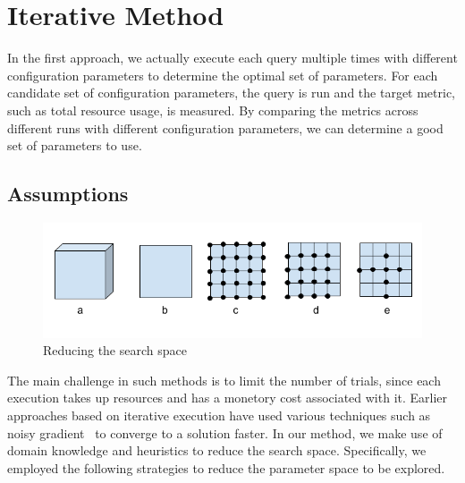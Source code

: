 \section{Iterative Method} \label{section:iter}
In the first approach, we actually execute each query multiple times with different configuration parameters to determine the optimal set of parameters. For each candidate set of configuration parameters, the query is run and the target metric, such as total resource usage, is measured. By comparing the metrics across different runs with different configuration parameters, we can determine a good set of parameters to use. 

\subsection{Assumptions}
\label{sec:assumptions}
\begin{figure}[h]
	\includegraphics[width=\linewidth]{fig/searchspace.png}
	\caption{Reducing the search space}
	\label{fig:searchspace}
\end{figure}


The main challenge in such methods is to limit the number of trials, since each execution takes up resources and has a monetory cost associated with it. Earlier approaches based on iterative execution have used various techniques such as noisy gradient~\cite{KumarPLPGB16} to converge to a solution faster. In our method, we make use of domain knowledge and heuristics to reduce the search space. Specifically, we employed the following strategies to reduce the parameter space to be explored.

